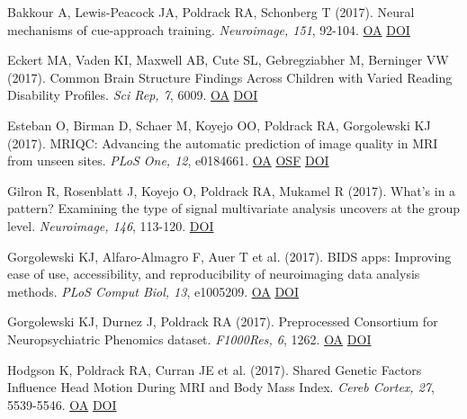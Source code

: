 \documentclass[10pt, letterpaper]{article}
\begin{document}
Bakkour A, Lewis-Peacock JA, Poldrack RA, Schonberg T (2017). Neural mechanisms of cue-approach training. \textit{Neuroimage, 151}, 92-104. \href{https://www.ncbi.nlm.nih.gov/pmc/articles/PMC5365383}{OA} \href{http://dx.doi.org/10.1016/j.neuroimage.2016.09.059}{DOI} \vspace{2mm}

Eckert MA, Vaden KI, Maxwell AB, Cute SL, Gebregziabher M, Berninger VW (2017). Common Brain Structure Findings Across Children with Varied Reading Disability Profiles. \textit{Sci Rep, 7}, 6009. \href{https://www.ncbi.nlm.nih.gov/pmc/articles/PMC5519686}{OA} \href{http://dx.doi.org/10.1038/s41598-017-05691-5}{DOI} \vspace{2mm}

Esteban O, Birman D, Schaer M, Koyejo OO, Poldrack RA, Gorgolewski KJ (2017). MRIQC: Advancing the automatic prediction of image quality in MRI from unseen sites. \textit{PLoS One, 12}, e0184661. \href{https://www.ncbi.nlm.nih.gov/pmc/articles/PMC5612458}{OA} \href{https://osf.io/haf97/}{OSF} \href{http://dx.doi.org/10.1371/journal.pone.0184661}{DOI} \vspace{2mm}

Gilron R, Rosenblatt J, Koyejo O, Poldrack RA, Mukamel R (2017). What's in a pattern? Examining the type of signal multivariate analysis uncovers at the group level. \textit{Neuroimage, 146}, 113-120. \href{http://dx.doi.org/10.1016/j.neuroimage.2016.11.019}{DOI} \vspace{2mm}

Gorgolewski KJ, Alfaro-Almagro F, Auer T et al. (2017). BIDS apps: Improving ease of use, accessibility, and reproducibility of neuroimaging data analysis methods. \textit{PLoS Comput Biol, 13}, e1005209. \href{https://www.ncbi.nlm.nih.gov/pmc/articles/PMC5363996}{OA} \href{http://dx.doi.org/10.1371/journal.pcbi.1005209}{DOI} \vspace{2mm}

Gorgolewski KJ, Durnez J, Poldrack RA (2017). Preprocessed Consortium for Neuropsychiatric Phenomics dataset. \textit{F1000Res, 6}, 1262. \href{https://www.ncbi.nlm.nih.gov/pmc/articles/PMC5664981}{OA} \href{http://dx.doi.org/10.12688/f1000research.11964.2}{DOI} \vspace{2mm}

Hodgson K, Poldrack RA, Curran JE et al. (2017). Shared Genetic Factors Influence Head Motion During MRI and Body Mass Index. \textit{Cereb Cortex, 27}, 5539-5546. \href{https://www.ncbi.nlm.nih.gov/pmc/articles/PMC6075600}{OA} \href{http://dx.doi.org/10.1093/cercor/bhw321}{DOI} \vspace{2mm}
\end{document}
